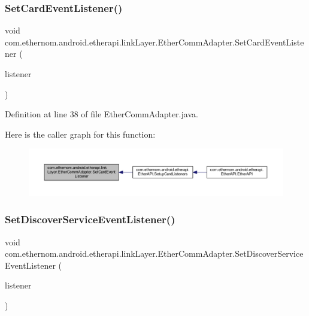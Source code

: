 \subsubsection{\texorpdfstring{Set\+Card\+Event\+Listener()}{SetCardEventListener()}}
{\footnotesize\ttfamily void com.\+ethernom.\+android.\+etherapi.\+link\+Layer.\+Ether\+Comm\+Adapter.\+Set\+Card\+Event\+Listener (\begin{DoxyParamCaption}\item[{\mbox{\hyperlink{classcom_1_1ethernom_1_1android_1_1etherapi_1_1link_layer_1_1_card_event_listener}{Card\+Event\+Listener}}}]{listener }\end{DoxyParamCaption})}



Definition at line 38 of file Ether\+Comm\+Adapter.\+java.

Here is the caller graph for this function\+:\nopagebreak
\begin{figure}[H]
\begin{center}
\leavevmode
\includegraphics[width=350pt]{classcom_1_1ethernom_1_1android_1_1etherapi_1_1link_layer_1_1_ether_comm_adapter_a1f7f6961c42491f67d7fd9e7c187340c_icgraph}
\end{center}
\end{figure}
\mbox{\label{classcom_1_1ethernom_1_1android_1_1etherapi_1_1link_layer_1_1_ether_comm_adapter_a57af184b11f4ccd518e6abcea71438fd}} 
\subsubsection{\texorpdfstring{Set\+Discover\+Service\+Event\+Listener()}{SetDiscoverServiceEventListener()}}
{\footnotesize\ttfamily void com.\+ethernom.\+android.\+etherapi.\+link\+Layer.\+Ether\+Comm\+Adapter.\+Set\+Discover\+Service\+Event\+Listener (\begin{DoxyParamCaption}\item[{\mbox{\hyperlink{interfacecom_1_1ethernom_1_1android_1_1etherapi_1_1_discover_service_listener}{Discover\+Service\+Listener}}}]{listener }\end{DoxyParamCaption})}



